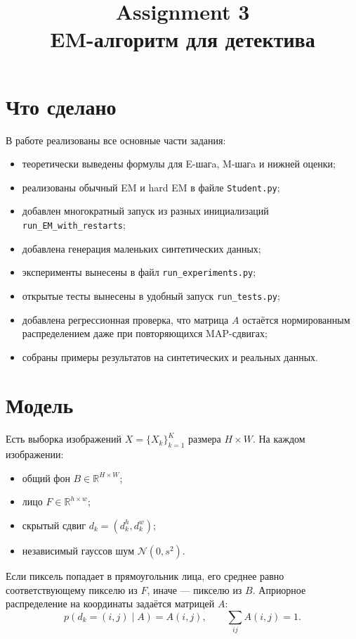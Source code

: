 \documentclass[12pt,a4paper]{article}
\title{Assignment 3\\EM-алгоритм для детектива}
\author{}
\date{}
\begin{document}
\maketitle

\section*{Что сделано}

В работе реализованы все основные части задания:
\begin{itemize}
    \item теоретически выведены формулы для E-шагa, M-шагa и нижней оценки;
    \item реализованы обычный EM и hard EM в файле \texttt{Student.py};
    \item добавлен многократный запуск из разных инициализаций \texttt{run\_EM\_with\_restarts};
    \item добавлена генерация маленьких синтетических данных;
    \item эксперименты вынесены в файл \texttt{run\_experiments.py};
    \item открытые тесты вынесены в удобный запуск \texttt{run\_tests.py};
    \item добавлена регрессионная проверка, что матрица $A$ остаётся нормированным распределением даже при повторяющихся MAP-сдвигах;
    \item собраны примеры результатов на синтетических и реальных данных.
\end{itemize}

\section{Модель}

Есть выборка изображений $X = \{X_k\}_{k=1}^{K}$ размера $H \times W$. На каждом изображении:
\begin{itemize}
    \item общий фон $B \in \mathbb{R}^{H \times W}$;
    \item лицо $F \in \mathbb{R}^{h \times w}$;
    \item скрытый сдвиг $d_k = (d_k^h, d_k^w)$;
    \item независимый гауссов шум $\mathcal{N}(0, s^2)$.
\end{itemize}

Если пиксель попадает в прямоугольник лица, его среднее равно соответствующему пикселю из $F$, иначе --- пикселю из $B$. Априорное распределение на координаты задаётся матрицей $A$:
\[
p(d_k = (i,j) \mid A) = A(i,j),
\qquad
\sum_{ij} A(i,j) = 1.
\]
\end{document}
